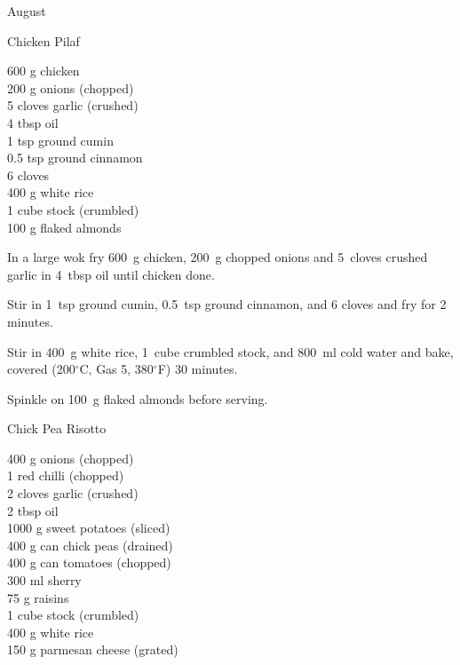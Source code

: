 \begin{menu}{August}
    \begin{recipe}{2}{Chicken Pilaf}%
		\begin{ingredients}
		600 g chicken  \\
	200 g onions (chopped) \\
	5 cloves garlic (crushed) \\
	4 tbsp oil  \\
	1 tsp ground cumin  \\
	0.5 tsp ground cinnamon  \\
	6  cloves  \\
	400 g white rice  \\
	1 cube stock (crumbled) \\
	100 g flaked almonds  \\
	
		\end{ingredients}
	
	
    \begin{instructions}
    \item 
        In a large wok fry
        600~g  chicken,
        200~g chopped onions
        and
        5~cloves crushed garlic
        in
        4~tbsp  oil
        until chicken done.
      \item 
        Stir in
        1~tsp  ground cumin,
        0.5~tsp  ground cinnamon,
        and
        6  cloves
        and fry for 2 minutes.
      \item 
        Stir in
        400~g  white rice,
        1~cube crumbled stock,
        and
        800~ml  cold water
        and bake, covered (200$^{\circ}$C, Gas 5, 380$^{\circ}$F) 30 minutes.
      \item 
        Spinkle on
        100~g  flaked almonds
        before serving.
      
    \end{instructions}
    \end{recipe}%
  
    \begin{recipe}{2}{Chick Pea Risotto}%
		\begin{ingredients}
		400 g onions (chopped) \\
	1  red chilli (chopped) \\
	2 cloves garlic (crushed) \\
	2 tbsp oil  \\
	1000 g sweet potatoes (sliced) \\
	400 g can chick peas (drained) \\
	400 g can tomatoes (chopped) \\
	300 ml sherry  \\
	75 g raisins  \\
	1 cube stock (crumbled) \\
	400 g white rice  \\
	150 g parmesan cheese (grated) \\
	

\end{ingredients}
\end{recipe}
\end{menu}
